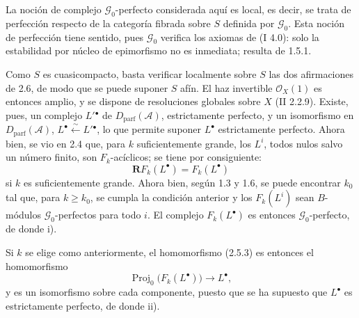 La noción de complejo $\mathcal G_0$-perfecto considerada aquí es local, es decir, se trata de perfección respecto de la categoría fibrada sobre $S$ definida por $\mathcal G_0$. Esta noción de perfección tiene sentido, pues $\mathcal G_0$ verifica los axiomas de (I 4.0): solo la estabilidad por núcleo de epimorfismo no es inmediata; resulta de 1.5.1.

Como $S$ es cuasicompacto, basta verificar localmente sobre $S$ las dos afirmaciones de 2.6, de modo que se puede suponer $S$ afín. El haz invertible $\mathcal O_X(1)$ es entonces amplio, y se dispone de resoluciones globales sobre $X$ (II 2.2.9). Existe, pues, un complejo $L'{}^{\bullet}$ de $D_{\mathrm{parf}}(\mathcal A)$, estrictamente perfecto, y un isomorfismo en $D_{\mathrm{parf}}(\mathcal A)$, $L^{\bullet}\xleftarrow{\sim}L'{}^{\bullet}$, lo que permite suponer $L^{\bullet}$ estrictamente perfecto. Ahora bien, se vio en 2.4 que, para $k$ suficientemente grande, los $L^i$, todos nulos salvo un número finito, son $F_k$-acíclicos; se tiene por consiguiente:
\[
  \mathbf R F_k(L^{\bullet})=F_k(L^{\bullet})
\]
si $k$ es suficientemente grande. Ahora bien, según 1.3 y 1.6, se puede encontrar $k_0$ tal que, para $k\geq k_0$, se cumpla la condición anterior y los $F_k(L^i)$ sean $B$-módulos $\mathcal G_0$-perfectos para todo $i$. El complejo $F_k(L^{\bullet})$ es entonces $\mathcal G_0$-perfecto, de donde i).

Si $k$ se elige como anteriormente, el homomorfismo (2.5.3) es entonces el homomorfismo
\[
  \operatorname{Proj}_0\bigl(F_k(L^{\bullet})\bigr)\longrightarrow L^{\bullet},
\]
y es un isomorfismo sobre cada componente, puesto que se ha supuesto que $L^{\bullet}$ es estrictamente perfecto, de donde ii).

